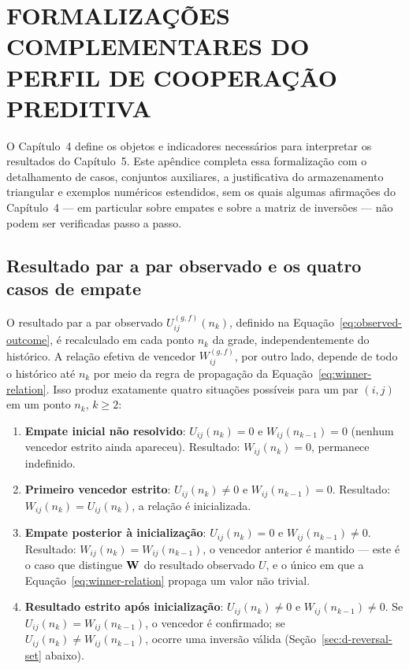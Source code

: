 \chapter{FORMALIZAÇÕES COMPLEMENTARES DO PERFIL DE COOPERAÇÃO PREDITIVA}
\label{ap:formalizacao}

O Capítulo~4 define os objetos e indicadores necessários para interpretar os resultados do Capítulo~5. Este apêndice completa essa formalização com o detalhamento de casos, conjuntos auxiliares, a justificativa do armazenamento triangular e exemplos numéricos estendidos, sem os quais algumas afirmações do Capítulo~4 --- em particular sobre empates e sobre a matriz de inversões --- não podem ser verificadas passo a passo.

\section{Resultado par a par observado e os quatro casos de empate}

O resultado par a par observado $U^{(g,f)}_{ij}(n_k)$, definido na Equação~\eqref{eq:observed-outcome}, é recalculado em cada ponto $n_k$ da grade, independentemente do histórico. A relação efetiva de vencedor $W^{(g,f)}_{ij}$, por outro lado, depende de todo o histórico até $n_k$ por meio da regra de propagação da Equação~\eqref{eq:winner-relation}. Isso produz exatamente quatro situações possíveis para um par $(i,j)$ em um ponto $n_k$, $k\geq2$:

\begin{enumerate}
  \item \textbf{Empate inicial não resolvido}: $U_{ij}(n_k)=0$ e $W_{ij}(n_{k-1})=0$ (nenhum vencedor estrito ainda apareceu). Resultado: $W_{ij}(n_k)=0$, permanece indefinido.
  \item \textbf{Primeiro vencedor estrito}: $U_{ij}(n_k)\neq0$ e $W_{ij}(n_{k-1})=0$. Resultado: $W_{ij}(n_k)=U_{ij}(n_k)$, a relação é inicializada.
  \item \textbf{Empate posterior à inicialização}: $U_{ij}(n_k)=0$ e $W_{ij}(n_{k-1})\neq0$. Resultado: $W_{ij}(n_k)=W_{ij}(n_{k-1})$, o vencedor anterior é mantido --- este é o caso que distingue $\mathbf{W}$ do resultado observado $U$, e o único em que a Equação~\eqref{eq:winner-relation} propaga um valor não trivial.
  \item \textbf{Resultado estrito após inicialização}: $U_{ij}(n_k)\neq0$ e $W_{ij}(n_{k-1})\neq0$. Se $U_{ij}(n_k)=W_{ij}(n_{k-1})$, o vencedor é confirmado; se $U_{ij}(n_k)\neq W_{ij}(n_{k-1})$, ocorre uma inversão válida (Seção~\ref{sec:d-reversal-set} abaixo).
\end{enumerate}

